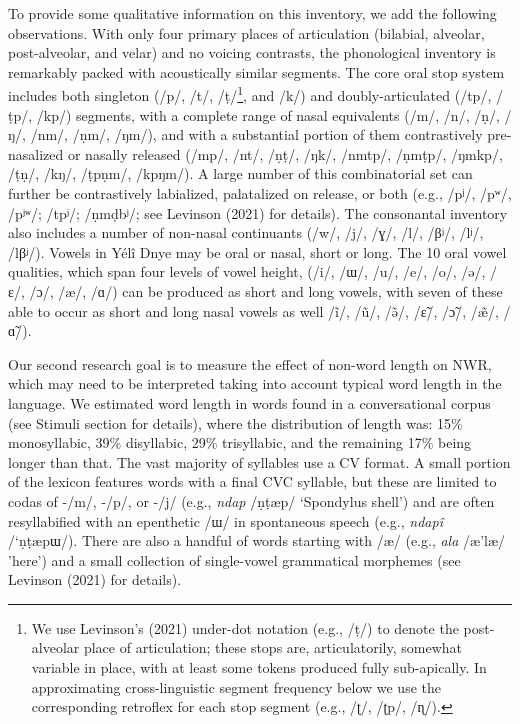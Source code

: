 \documentclass[
  english,
  ,man,floatsintext]{apa6}
\begin{document}
To provide some qualitative information on this inventory, we add the following observations. With only four primary places of articulation (bilabial, alveolar, post-alveolar, and velar) and no voicing contrasts, the phonological inventory is remarkably packed with acoustically similar segments. The core oral stop system includes both singleton (/p/, /t/, /ṭ/\footnote{We use Levinson's (2021) under-dot notation (e.g., /ṭ/) to denote the post-alveolar place of articulation; these stops are, articulatorily, somewhat variable in place, with at least some tokens produced fully sub-apically. In approximating cross-linguistic segment frequency below we use the corresponding retroflex for each stop segment (e.g., /ʈ/, /ʈp/, /ɳ/).}, and /k/) and doubly-articulated (/tp/, /ṭp/, /kp/) segments, with a complete range of nasal equivalents (/m/, /n/, /ṇ/, /ŋ/, /nm/, /ṇm/, /ŋm/), and with a substantial portion of them contrastively pre-nasalized or nasally released (/mp/, /nt/, /ṇṭ/, /ŋk/, /nmtp/, /ṇmṭp/, /ŋmkp/, /ṭṇ/, /kŋ/, /ṭpṇm/, /kpŋm/). A large number of this combinatorial set can further be contrastively labialized, palatalized on release, or both (e.g., /pʲ/, /pʷ/, /pʲʷ/; /tpʲ/; /ṇmḍbʲ/; see Levinson (2021) for details). The consonantal inventory also includes a number of non-nasal continuants (/w/, /j/, /ɣ/, /l/, /βʲ/, /lʲ/, /lβʲ/). Vowels in Yélî Dnye may be oral or nasal, short or long. The 10 oral vowel qualities, which span four levels of vowel height, (/i/, /ɯ/, /u/, /e/, /o/, /ə/, /ɛ/, /ɔ/, /æ/, /ɑ/) can be produced as short and long vowels, with seven of these able to occur as short and long nasal vowels as well /ĩ/, /ũ/, /ə̃/, /ɛ̃/, /ɔ̃/, /æ̃/, /ɑ̃/).

Our second research goal is to measure the effect of non-word length on NWR, which may need to be interpreted taking into account typical word length in the language.
We estimated word length in words found in a conversational corpus (see Stimuli section for details), where the distribution of length was: 15\% monosyllabic, 39\% disyllabic, 29\% trisyllabic, and the remaining 17\% being longer than that. The vast majority of syllables use a CV format. A small portion of the lexicon features words with a final CVC syllable, but these are limited to codas of -/m/, -/p/, or -/j/ (e.g., \emph{ndap} /ṇṭæp/ `Spondylus shell') and are often resyllabified with an epenthetic /ɯ/ in spontaneous speech (e.g., \emph{ndapî} /`ṇṭæpɯ/). There are also a handful of words starting with /æ/ (e.g., \emph{ala} /æ'læ/ 'here') and a small collection of single-vowel grammatical morphemes (see Levinson (2021) for details).
\end{document}
